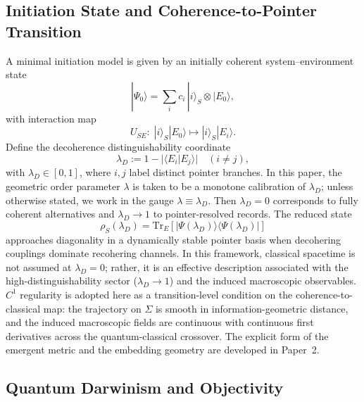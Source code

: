 \documentclass[aps,prd,twocolumn,superscriptaddress,nofootinbib,floatfix]{revtex4-2}
\newcommand{\Sig}{\Sigma}
\begin{document}
\subsection{Initiation State and Coherence-to-Pointer Transition}

A minimal initiation model is given by an initially coherent system--environment state
\begin{equation}\label{eq:initiation-state}
|\Psi_0\rangle = \sum_i c_i \, |i\rangle_S \otimes |E_0\rangle,
\end{equation}
with interaction map
\begin{equation}\label{eq:initiation-map}
U_{SE}: \; |i\rangle_S |E_0\rangle \mapsto |i\rangle_S |E_i\rangle.
\end{equation}
Define the decoherence distinguishability coordinate
\begin{equation}\label{eq:initiation-lambda}
\lambda_D := 1 - \big|\langle E_i | E_j \rangle\big| \quad (i \neq j),
\end{equation}
with $\lambda_D \in [0,1]$, where $i,j$ label distinct pointer branches. In this paper, the geometric order parameter $\lambda$ is taken to be a monotone calibration of $\lambda_D$; unless otherwise stated, we work in the gauge $\lambda \equiv \lambda_D$. Then $\lambda_D = 0$ corresponds to fully coherent alternatives and $\lambda_D \to 1$ to pointer-resolved records. The reduced state
\begin{equation}\label{eq:initiation-reduced}
\rho_S(\lambda_D) = \mathrm{Tr}_E\!\left[|\Psi(\lambda_D)\rangle\langle\Psi(\lambda_D)|\right]
\end{equation}
approaches diagonality in a dynamically stable pointer basis when decohering couplings dominate recohering channels. In this framework, classical spacetime is not assumed at $\lambda_D = 0$; rather, it is an effective description associated with the high-distinguishability sector ($\lambda_D \to 1$) and the induced macroscopic observables. $C^1$ regularity is adopted here as a transition-level condition on the coherence-to-classical map: the trajectory on $\Sig$ is smooth in information-geometric distance, and the induced macroscopic fields are continuous with continuous first derivatives across the quantum-classical crossover. The explicit form of the emergent metric and the embedding geometry are developed in Paper~2.

\subsection{Quantum Darwinism and Objectivity}
\end{document}
